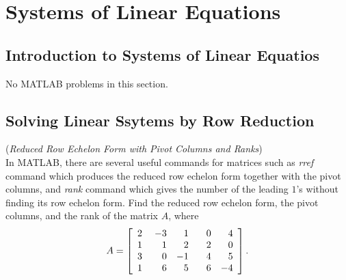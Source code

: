 \chapter {Systems of Linear Equations}


\section{Introduction to Systems of Linear Equatios}

No MATLAB problems in this section.

\section{Solving Linear Ssytems by Row Reduction}
\begin{exer}
(\textit{Reduced Row Echelon Form with Pivot Columns and Ranks}) \\
In MATLAB, there are several useful commands for matrices such as \textit{rref} command which produces the reduced row echelon form together with the pivot columns, and \textit{rank} command which gives the number of the leading $1$'s without finding its row echelon form. Find the reduced row echelon form, the pivot columns, and the rank of the matrix $A$, where
\vspace{2mm}
\begin{displaymath}
A = \left[\begin{array}{rrrrr} 2& \hspace{1mm}-3& \hspace{1mm} 1& \hspace{3mm} 0& \hspace{2mm} 4 \\ 1 & 1 & 2 & 2 & 0 \\ 3 & 0 & -1 & 4 & 5 \\ 1 & 6 & 5 & 6 & -4 \end{array} \right].
\end{displaymath}
\end{exer}

